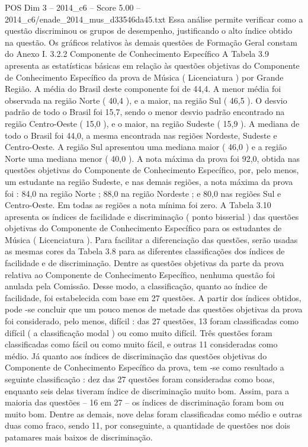 \begin{textsample}{POS Dim 3 – 2014\_c6 – Score 5.00 – 2014\_c6/enade\_2014\_mus\_d33546da45.txt}
Essa análise permite verificar como a questão discriminou os grupos de desempenho, justificando o alto índice obtido na questão.
Os gráficos relativos às demais questões de Formação Geral constam do Anexo I. 3.2.2 Componente de Conhecimento Específico A Tabela 3.9 apresenta as estatísticas básicas em relação às questões objetivas do Componente de Conhecimento Específico da prova de Música ( Licenciatura ) por Grande Região.
A média do Brasil deste componente foi de 44,4.
A menor média foi observada na região Norte ( 40,4 ), e a maior, na região Sul ( 46,5 ).
O desvio padrão de todo o Brasil foi 15,7, sendo o menor desvio padrão encontrado na região Centro-Oeste ( 15,0 ), e o maior, na região Sudeste ( 15,9 ).
A mediana de todo o Brasil foi 44,0, a mesma encontrada nas regiões Nordeste, Sudeste e Centro-Oeste.
A região Sul apresentou uma mediana maior ( 46,0 ) e a região Norte uma mediana menor ( 40,0 ).
A nota máxima da prova foi 92,0, obtida nas questões objetivas do Componente de Conhecimento Específico, por, pelo menos, um estudante na região Sudeste, e nas demais regiões, a nota máxima da prova foi : 84,0 na região Norte ; 88,0 na região Nordeste ; e 80,0 nas regiões Sul e Centro-Oeste.
Em todas as regiões a nota mínima foi zero.
A Tabela 3.10 apresenta os índices de facilidade e discriminação ( ponto bisserial ) das questões objetivas do Componente de Conhecimento Específico para os estudantes de Música ( Licenciatura ).
Para facilitar a diferenciação das questões, serão usadas as mesmas cores da Tabela 3.8 para as diferentes classificações dos índices de facilidade e de discriminação.
Dentre as questões objetivas da parte da prova relativa ao Componente de Conhecimento Específico, nenhuma questão foi anulada pela Comissão.
Desse modo, a classificação, quanto ao índice de facilidade, foi estabelecida com base em 27 questões.
A partir dos índices obtidos, pode -se concluir que um pouco menos de metade das questões objetivas da prova foi considerado, pelo menos, difícil : das 27 questões, 13 foram classificadas como difícil ( a classificação modal ) ou como muito difícil.
Três questões foram classificadas como fácil ou como muito fácil, e outras 11 consideradas como médio.
Já quanto aos índices de discriminação das questões objetivas do Componente de Conhecimento Específico da prova, tem -se como resultado a seguinte classificação : dez das 27 questões foram consideradas como boas, enquanto seis delas tiveram índice de discriminação muito bom.
Assim, para a maioria das questões – 16 em 27 – os índices de discriminação foram bom ou muito bom.
Dentre as demais, nove delas foram classificadas como médio e outras duas como fraco, sendo 11, por conseguinte, a quantidade de questões nos dois patamares mais baixos de discriminação.

\end{textsample}
